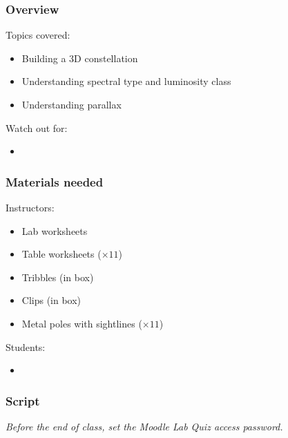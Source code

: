 \documentclass[12pt]{article}
\begin{document}
\subsubsection{Overview}

Topics covered:
\begin{itemize}
\item Building a 3D constellation
\item Understanding spectral type and luminosity class
\item Understanding parallax
\end{itemize}

\noindent
Watch out for:
\begin{itemize}
\item 
\end{itemize}


\subsubsection{Materials needed}

Instructors:
\begin{itemize}
\item Lab worksheets
\item Table worksheets ($\times 11$)
\item Tribbles (in box)
\item Clips (in box)
\item Metal poles with sightlines ($\times 11$)
\end{itemize}

\noindent
Students:
\begin{itemize}
\item 
\end{itemize}


\subsubsection{Script}


\emph{Before the end of class, set the Moodle Lab Quiz access password.}
\end{document}
